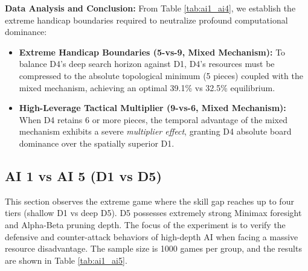 \textbf{Data Analysis and Conclusion:} 
From Table \ref{tab:ai1_ai4}, we establish the extreme handicap boundaries required to neutralize profound computational dominance:
\begin{itemize}
    \item \textbf{Extreme Handicap Boundaries (5-vs-9, Mixed Mechanism):} To balance D4's deep search horizon against D1, D4's resources must be compressed to the absolute topological minimum (5 pieces) coupled with the mixed mechanism, achieving an optimal 39.1\% vs 32.5\% equilibrium.
    \item \textbf{High-Leverage Tactical Multiplier (9-vs-6, Mixed Mechanism):} When D4 retains 6 or more pieces, the temporal advantage of the mixed mechanism exhibits a severe \emph{multiplier effect}, granting D4 absolute board dominance over the spatially superior D1.
\end{itemize}

\subsection{AI 1 vs AI 5 (D1 vs D5)}
\label{subsec:ai1_ai5}

This section observes the extreme game where the skill gap reaches up to four tiers (shallow D1 vs deep D5). D5 possesses extremely strong Minimax foresight and Alpha-Beta pruning depth. The focus of the experiment is to verify the defensive and counter-attack behaviors of high-depth AI when facing a massive resource disadvantage. The sample size is 1000 games per group, and the results are shown in Table \ref{tab:ai1_ai5}.

\begin{table}[htbp]
    \centering
    \caption{AI 1 vs AI 5 Simulation Data Distribution (Sample Size=1000)}
    \label{tab:ai1_ai5}
\end{table}

